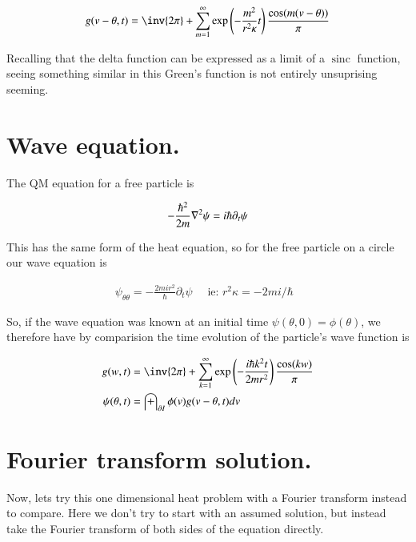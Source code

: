 \documentclass{article}
\DeclareMathOperator{\sinc}{sinc}
\begin{document}
\begin{align*}
g( v - \theta, t ) &= \inv{2 \pi} + \sum_{m=1}^\infty \exp\left(- \frac{m^2}{ r^2 \kappa } t \right) \frac{\cos(m (v -\theta))}{\pi} \\
\end{align*}

Recalling that the delta function can be expressed as a limit of a $\sinc$ function, seeing something similar
in this Green's function is not entirely unsuprising seeming.

\section{ Wave equation. }

The QM equation for a free particle is

\begin{align*}
-\frac{\hbar^2}{2m} \nabla^2 \psi = i \hbar \partial_t \psi
\end{align*}

This has the same form of the heat equation, so for the free particle on a circle our wave equation is

\begin{align*}
\psi_{\theta\theta} = - \frac{2 m i r^2 }{\hbar} \partial_t \psi \quad \mbox{ ie: $r^2 \kappa = - 2 m i /\hbar$ }
\end{align*}

So, if the wave equation was known at an initial time $\psi(\theta, 0) = \phi(\theta)$, we therefore have by comparision the time 
evolution of the particle's wave function is

\begin{align*}
g( w, t ) &= \inv{2 \pi} + \sum_{k=1}^\infty \exp\left(- \frac{i \hbar k^2 t}{ 2 m r^2 } \right) \frac{\cos(k w )}{\pi} \\
\psi(\theta, t) &= \int_{\partial I} \phi(v) g(v - \theta, t) dv 
\end{align*}


\section{ Fourier transform solution. }

Now, lets try this one dimensional heat problem with a Fourier transform instead to compare.  Here we don't try to start with an
assumed solution, but instead take the Fourier transform of both sides of the equation directly.
\end{document}
